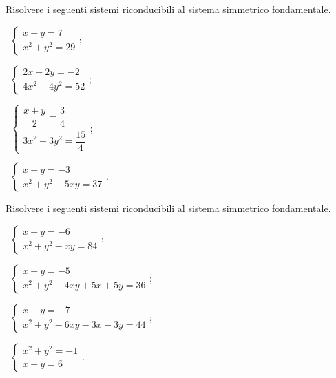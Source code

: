 \begin{esercizio}[\Ast]
 \label{ese:6.30}
Risolvere i seguenti sistemi riconducibili al sistema simmetrico fondamentale.
\begin{multicols}{2}
 \begin{enumeratea}
 \item~$\left\{\begin{array}{l}x+y=7 \\x^2+y^2=29\end{array}\right.$;
 \item~$\left\{\begin{array}{l}2x+2y=-2\\4x^2+4y^2=52\end{array}\right.$;
 \item~$\left\{\begin{array}{l}\dfrac{x+y} 2=\dfrac 3 4\\3x^2+3y^2=\dfrac{15} 4\end{array}\right.$;
 \item~$\left\{\begin{array}{l}x+y=-3 \\x^2+y^2-5xy=37\end{array}\right.$.
 \end{enumeratea}
 \end{multicols}
\end{esercizio}

\begin{esercizio}[\Ast]
\label{ese:6.31}
Risolvere i seguenti sistemi riconducibili al sistema simmetrico fondamentale.
\begin{multicols}{2}
 \begin{enumeratea}
 \item~$\left\{\begin{array}{l}x+y=-6 \\x^2+y^2-xy=84\end{array}\right.$;
 \item~$\left\{\begin{array}{l}x+y=-5 \\x^2+y^2-4xy+5x+5y=36\end{array}\right.$;
 \item~$\left\{\begin{array}{l}x+y=-7 \\x^2+y^2-6xy-3x-3y=44\end{array}\right.$;
 \item~$\left\{\begin{array}{l}x^2+y^2=-1\\x+y=6 \end{array}\right.$.
 \end{enumeratea}
 \end{multicols}
\end{esercizio}

